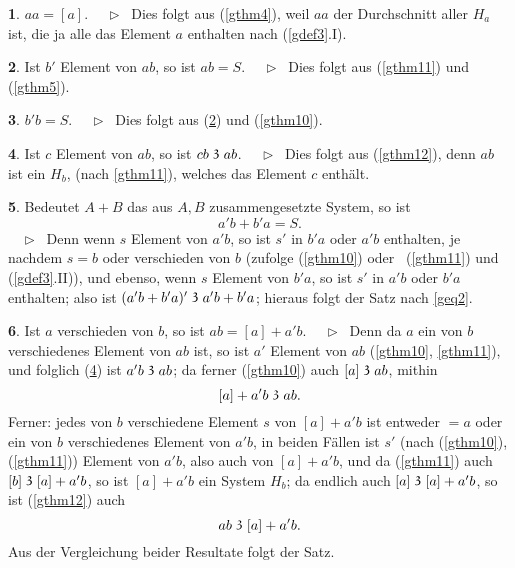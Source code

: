 \documentclass[leqno,hidelinks,a4paper]{article}
\theoremstyle{definition}
\newtheorem{sat}{\protect\satname}
\newcommand{\satname}{}
\renewcommand{\satname}{\hspace{-4pt}. Satz}%
\renewcommand{\satname}{\hspace{-4pt}. Theorem}%
\newcommand\Beweis{\newline $ \phantom{'.'} \rhd \ $}%
\newcommand\TeilVon{\mathrel{\raisebox{0.45ex}{$\mathfrak{3}$}}}
\begin{document}
\begin{paracol}{2}
\begin{sat}\label{gthm13}
$aa = [a]$.
\Beweis
Dies folgt aus (\ref{gthm4}), weil $aa$ der Durchschnitt aller $H_a$  ist, die
ja alle das Element $a$ enthalten nach (\ref{gdef3}.I).
\end{sat}

\begin{sat}\label{gthm14}
Ist $b'$ Element von $ab$, so ist $ab = S$.
\Beweis
Dies folgt aus (\ref{gthm11}) und (\ref{gthm5}).
\end{sat}

\begin{sat}\label{gthm15}
$b' b = S$.
\Beweis
Dies folgt aus (\ref{gthm14}) und (\ref{gthm10}).
\end{sat}

\begin{sat}\label{gthm16}
Ist $c$ Element von $ab$, so ist $cb \TeilVon ab$.
\Beweis
Dies folgt aus (\ref{gthm12}), denn $ab$ ist ein $H_b$,
(nach \ref{gthm11}), welches das Element $c$ enthält.
\end{sat}

\begin{sat}\label{gthm17}
Bedeutet $A + B$ das aus $A, B$ zusammengesetzte System, so ist
\[
	a'b + b'a = S.
\]
\vspace*{-16pt}%
\Beweis
Denn wenn $s$ Element von $a'b$, so ist $s'$ in $b'a$ oder $a'b$
enthalten, je nachdem $s = b$ oder verschieden von $b$ (zufolge (\ref{gthm10})
oder ~(\ref{gthm11}) und (\ref{gdef3}.II)), und ebenso, wenn $s$ Element von
$b'a$, so ist $s'$ in $a'b$ oder $b'a$ enthalten; also ist
$(a'b + b'a)' \TeilVon a'b + b'a$; hieraus folgt der Satz nach \eqref{geq2}.
\end{sat}

\begin{sat}\label{gthm18}
Ist $a$ verschieden von $b$, so ist $ab = [a] + a'b$.
\Beweis
Denn da $a$ ein von $b$ verschiedenes Element von $ab$ ist, so ist $a'$ Element
von $ab$ (\ref{gthm10}, \ref{gthm11}), und folglich (\ref{gthm16}) ist
$a'b \TeilVon ab$; da ferner (\ref{gthm10}) auch $[a] \TeilVon ab$, mithin
\[
	[a] + a'b \TeilVon ab.
\]
Ferner: jedes von $b$ verschiedene Element $s$ von $[a] + a'b$ ist entweder
$= a$ oder ein von $b$ verschiedenes Element von $a'b$, in beiden Fällen ist
$s'$ (nach (\ref{gthm10}), (\ref{gthm11})) Element von $a'b$, also auch von
$[a]+ a'b$, und da (\ref{gthm11}) auch $[b] \TeilVon [a] + a'b$, so ist
$[a] + a'b$ ein System $H_b$; da endlich auch $[a] \TeilVon [a] + a'b$, so ist
(\ref{gthm12}) auch
\[
	ab \TeilVon [a] + a' b.
\]
Aus der Vergleichung beider Resultate folgt der Satz.
\end{sat}


\end{paracol}
\end{document}
